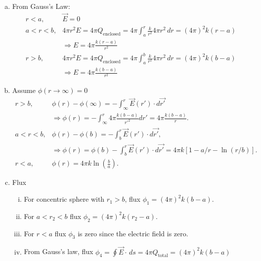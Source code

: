 \documentclass{esg8022pset}
\begin{document}
\begin{solution}
  \begin{enumerate}[(a)]
    \item From Gauss's Law: 
      \begin{align*}
        r<a,   & \vec{E}=0\\
        a<r<b, & 4\pi r^2 E = 4\pi Q_{\text{enclosed}} = 4\pi\int_a^r \frac{k}{r^2}4\pi r^2\,dr=(4\pi)^2k(r-a)\\
               & \Rightarrow E = 4\pi \frac{k(r-a)}{r^2}\\
        r>b,   & 4\pi r^2 E = 4\pi Q_{\text{enclosed}} = 4\pi\int_a^b \frac{k}{r^2}4\pi r^2\,dr=(4\pi)^2k(b-a)\\
               & \Rightarrow E= 4\pi \frac{k(b-a)}{r^2}
      \end{align*}

    \item Assume $\phi(r\rightarrow\infty)=0$
      \begin{align*}
        r>b,  &  \phi(r)-\phi(\infty)=-\int_\infty^r \vec{E}(r') \cdot d\vec{r'} \\
              & \Rightarrow \phi(r)=-\int_\infty^r 4\pi \frac{k(b-a)}{r'^2}dr'=4\pi \frac{k(b-a)}{r}.\\
        a<r<b,& \phi(r)-\phi(b)=-\int_b^r\vec{E}(r') \cdot d\vec{r'},\\
              & \Rightarrow \phi(r)= \phi(b)-\int_b^r\vec{E}(r') \cdot d\vec{r'}=4\pi k [1-a/r-\ln (r/b)].\\
        r<a,  & \phi(r)= 4\pi k\ln (\frac{b}{a}).
      \end{align*}

    \item Flux
      \begin{enumerate}[(i)]
        \item For concentric sphere with $r_1>b$, flux $\phi_1=(4\pi)^2k(b-a)$.\\
        \item For $a<r_2<b$ flux $\phi_2=(4\pi)^2k(r_2-a)$.\\
        \item For $r<a$ flux $\phi_3$ is zero since the electric field is zero.\\
        \item From Gauss's law, flux $\phi_4=\oint\vec{E} \cdot\,ds = 4\pi
          Q_{\text{total}} = (4\pi)^2 k(b-a)$
      \end{enumerate}
  \end{enumerate}
\end{solution}
\end{document}
